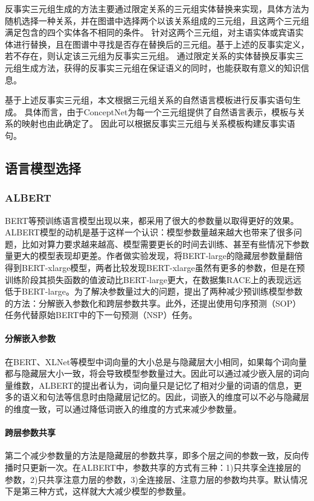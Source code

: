 反事实三元组生成的方法主要通过限定关系的三元组实体替换来实现，具体方法为随机选择一种关系，并在图谱中选择两个以该关系组成的三元组，且这两个三元组满足包含的四个实体各不相同的条件。
针对这两个三元组，对主语实体或宾语实体进行替换，且在图谱中寻找是否存在替换后的三元组。基于上述的反事实定义，若不存在，则认定该三元组为反事实三元组。
通过限定关系的实体替换反事实三元组生成方法，获得的反事实三元组在保证语义的同时，也能获取有意义的知识信息。

基于上述反事实三元组，本文根据三元组关系的自然语言模板进行反事实语句生成。
具体而言，由于ConceptNet为每一个三元组提供了自然语言表示，模板与关系的映射也由此确定了。
因此可以根据反事实三元组与关系模板构建反事实语句。

\subsection{语言模型选择}

\subsubsection{ALBERT}
BERT等预训练语言模型出现以来，都采用了很大的参数量以取得更好的效果。ALBERT模型的动机是基于这样一个认识：模型参数量越来越大也带来了很多问题，比如对算力要求越来越高、模型需要更长的时间去训练、甚至有些情况下参数量更大的模型表现却更差。作者做实验发现，将BERT-large的隐藏层参数量翻倍得到BERT-xlarge模型，两者比较发现BERT-xlarge虽然有更多的参数，但是在预训练阶段其损失函数的值波动比BERT-large更大，在数据集RACE上的表现远远低于BERT-large。为了解决参数量过大的问题，提出了两种减少预训练模型参数的方法：分解嵌入参数化和跨层参数共享。此外，还提出使用句序预测（SOP）任务代替原始BERT中的下一句预测（NSP）任务。
\paragraph{分解嵌入参数}
在BERT、XLNet等模型中词向量的大小总是与隐藏层大小相同，如果每个词向量都与隐藏层大小一致，将会导致模型参数量过大。因此可以通过减少嵌入层的词向量维数，ALBERT的提出者认为，词向量只是记忆了相对少量的词语的信息，更多的语义和句法等信息时由隐藏层记忆的。因此，词嵌入的维度可以不必与隐藏层的维度一致，可以通过降低词嵌入的维度的方式来减少参数量。
\paragraph{跨层参数共享}
第二个减少参数量的方法是隐藏层的参数共享，即多个层之间的参数一致，反向传播时只更新一次。在ALBERT中，参数共享的方式有三种：1)只共享全连接层的参数，2)只共享注意力层的参数，3)全连接层、注意力层的参数均共享。默认情况下是第三种方式，这样就大大减少模型的参数量。
